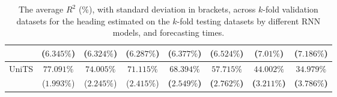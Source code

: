 \begin{table}[!ht]
{\begin{tabular}{|c|c|c|c|c|c|c|c|}
			 & ($6.345\%$) & ($6.324\%$) & ($6.287\%$) & ($6.377\%$) & ($6.524\%$) & ($7.01\%$) & ($7.186\%$) \\ \hline
			\multirow{2}{*}{UniTS} & $77.091\%$ & $74.005\%$ & $71.115\%$ & $\mathbf{68.394\%}$ & $\mathbf{57.715\%}$ & $\mathbf{44.002\%}$ & $\mathbf{34.979\%}$ \\
			 & ($1.993\%$) & ($2.245\%$) & ($2.415\%$) & \textbf{(}$\mathbf{2.549\%}$\textbf{)} & \textbf{(}$\mathbf{2.762\%}$\textbf{)} & \textbf{(}$\mathbf{3.211\%}$\textbf{)} & \textbf{(}$\mathbf{3.786\%}$\textbf{)} \\ \hline
		\end{tabular}
	}
	\caption{The average $R^{2}$ (\%), with standard deviation in brackets, across $k$-fold validation datasets for the heading estimated on the $k$-fold testing datasets by different RNN models, and forecasting times.}
	\label{tab:all_direction_R2}
\end{table}